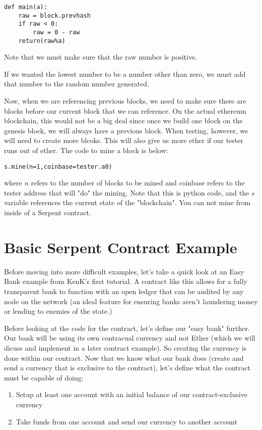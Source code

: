 \documentclass[12pt]{article}
\begin{document}
\begin{lstlisting}
def main(a):
	raw = block.prevhash
	if raw < 0:
		raw = 0 - raw
	return(raw%a)
\end{lstlisting}

Note that we must make sure that the raw number is positive. \cite{PeterBorah 2014}

If we wanted the lowest number to be a number other than zero, we must add that number to the random number generated. 

Now, when we are referencing previous blocks, we need to make sure there are blocks before our current block that we can reference. On the actual ethereum blockchain, this would not be a big deal since once we build one block on the genesis block, we will always have a previous block. When testing, however, we will need to create more blcoks. This will also give us more ether if our tester runs out of ether. The code to mine a block is below:

\begin{lstlisting}
s.mine(n=1,coinbase=tester.a0)
\end{lstlisting}

where $n$ refers to the number of blocks to be mined and coinbase refers to the tester address that will "do" the mining. Note that this is python code, and the $s$ variable references the current state of the "blockchain". You can not mine from inside of a Serpent contract. \cite{Using pyethereum.tester}

\section{Basic Serpent Contract Example}
Before moving into more difficult examples, let's take a quick look at an Easy Bank example from KenK's first tutorial. A contract like this allows for a fully transparent bank to function with an open ledger that can be audited by any node on the network (an ideal feature for ensuring banks aren't laundering money or lending to enemies of the state.)

Before looking at the code for the contract, let's define our "easy bank" further. Our bank will be using its own contracual currency and not Ether (which we will dicuss and implement in a later contract example). So creating the currency is done within our contract. Now that we know what our bank does (create and send a currency that is exclusive to the contract), let's define what the contract must be capable of doing:
\begin{enumerate}
\item Setup at least one account with an initial balance of our contract-exclusive currency
\item Take funds from one account and send our currency to another account
\end{enumerate}
\end{document}
